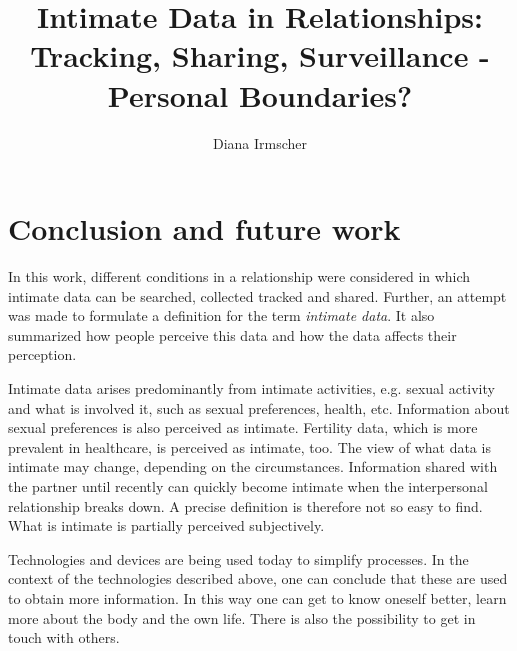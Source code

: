 \documentclass[journal]{vgtc}                %
\title{Intimate Data in Relationships: Tracking, Sharing, Surveillance - Personal Boundaries?}
\author{Diana Irmscher}
\begin{document}

\maketitle

%
%










%

\section{Conclusion and future work}
\label{sec:conculsion}
In this work, different conditions in a relationship  were considered in which intimate data can be searched, collected tracked and shared.
Further, an attempt was made to formulate a definition for the term \textit{intimate data}. It also summarized how people perceive this data and how the data affects their perception.

Intimate data arises predominantly from intimate activities, e.g. sexual activity and what is involved it, such as sexual preferences, health, etc. Information about sexual preferences is also perceived as intimate. Fertility data, which is more prevalent in healthcare, is perceived as intimate, too. The view of what data is intimate may change, depending on the circumstances. Information shared with the partner until recently can quickly become intimate when the interpersonal relationship breaks down. A precise definition is therefore not so easy to find. What is intimate is partially perceived subjectively.

Technologies and devices are being used today to simplify processes. In the context of the technologies described above, one can conclude that these are used to obtain more information. In this way one can get to know oneself better, learn more about the body and the  own life. There is also the possibility to get in touch with others.
\end{document}
